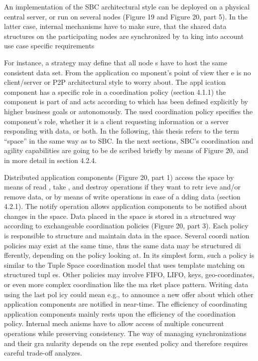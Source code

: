 \documentclass[a4paper,12pt]{scrreprt}
\begin{document}
		An implementation of the SBC architectural
		style can be deployed on a physical central
		server, or run on several nodes (Figure 19 and Figure 20, part 5). In the latter case,
		internal mechanisms have to make sure, that the shared data structures on the
		participating nodes are synchronized by ta
		king into account use case specific
		requirements
		
		For instance, a strategy may define that all node
		s have to host the same consistent data
		set. From the application co
		mponent’s point of view ther
		e is no client/server or P2P
		architectural style to worry about. The appl
		ication component has a specific role in a
		coordination policy (section 4.1.1) the component
		is part of and acts according to which
		has been defined explicitly by higher business goals or autonomously. The used
		coordination policy specifies the component’s
		role, whether it is a client requesting
		information or a server responding with data, or both. In the following, this thesis refers
		to the term “space” in the same
		way as to SBC. In the next
		sections, SBC’s coordination
		and agility capabilities are going to be de
		scribed briefly by means of Figure 20, and in
		more detail in section 4.2.4. 
		
		Distributed application components (Figure
		20, part 1) access the space by means of
		read
		,
		take
		, and
		destroy
		operations if they want to retr
		ieve and/or remove data, or by
		means of
		write
		operations in case of a
		dding data (section 4.2.1). The
		notify
		operation
		allows application components to be
		notified about changes in the space.
		Data placed in the space is stored in a
		structured way according to exchangeable
		coordination policies (Figure 20, part 3). Each
		policy is responsible
		to structure and
		maintain data in the space. Several coordi
		nation policies may exist at the same time,
		thus the same data may be structured di
		fferently, depending on the policy looking at. In
		its simplest form, such a policy is similar
		to the Tuple Space coordination model that
		uses template matching on structured tupl
		es. Other policies may involve FIFO, LIFO,
		keys, geo-coordinates, or even more complex
		coordination like the ma
		rket place pattern.
		Writing data using the last pol
		icy could mean e.g., to announce a new offer about which
		other application components
		are notified in near-time.
		The efficiency of coordinating application
		components mainly rests upon the efficiency
		of the coordination policy. Internal mech
		anisms have to allow access of multiple
		concurrent operations while preserving
		consistency. The way of managing
		synchronizations and their gra
		nularity depends on the repr
		esented policy and therefore
		requires careful trade-off analyzes. 
		
\end{document}
